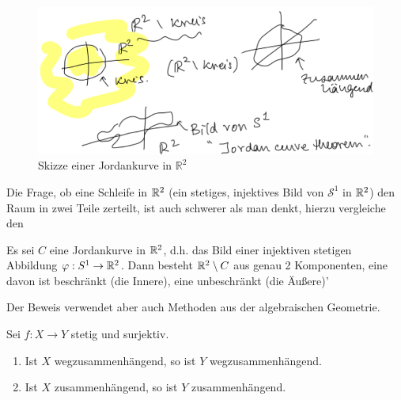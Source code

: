 \begin{figure}[h]
    \centering
    \includegraphics[scale=0.25]{figures/handdrawn/jordankurve.png}
    \caption{Skizze einer Jordankurve in $\mathbb{R}^2$}
\end{figure}

\begin{remark*}
    Die Frage, ob eine Schleife in $\mathbb{R}^2$ (ein stetiges, injektives Bild von $\mathcal{S}^1$ in $\mathbb{R}^2$) den Raum in zwei Teile zerteilt, ist auch schwerer als man denkt, hierzu vergleiche den
    \begin{theorem**}
        Es sei $C$ eine Jordankurve in  $\mathbb{R}^2$, d.h. das Bild einer injektiven stetigen Abbildung $\varphi : S^1 \to  \mathbb{R}^2$. Dann besteht $\mathbb{R}^2\setminus C$ aus genau 2 Komponenten, eine davon ist beschränkt (die Innere), eine unbeschränkt (die Äußere)'
    \end{theorem**}
    Der Beweis verwendet aber auch Methoden aus der algebraischen Geometrie.
\end{remark*}

\begin{lemma}\label{lm:bilder-von-zusammenhängenden-räumen-sind-zusammenhängend}
    Sei $f: X \to  Y$ stetig und surjektiv.
    \begin{enumerate}[1)]
        \item Ist $X$ wegzusammenhängend, so ist  $Y$ wegzusammenhängend.
        \item Ist  $X$ zusammenhängend, so ist $Y$ zusammenhängend.
    \end{enumerate}
\end{lemma}

